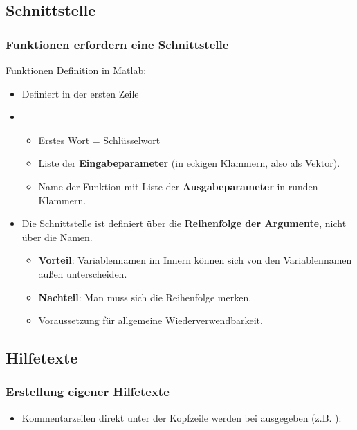   \subsection{Schnittstelle}
  \begin{frame}
      \frametitle{Funktionen erfordern eine Schnittstelle}
      Funktionen Definition in Matlab:
      \begin{itemize}
        \item Definiert in der ersten Zeile
        \item {}
        \begin{itemize}
          \item Erstes Wort = Schlüsselwort 
          \item Liste der \textbf{Eingabeparameter} (in eckigen Klammern, also als Vektor).
          \item Name der Funktion mit Liste der \textbf{Ausgabeparameter} in runden Klammern.
        \end{itemize}
        \item Die Schnittstelle ist definiert über die \textbf{Reihenfolge der Argumente}, nicht über die Namen.
        \begin{itemize}
          \item \textbf{Vorteil}: Variablennamen im Innern können sich von den Variablennamen außen unterscheiden.
          \item \textbf{Nachteil}: Man muss sich die Reihenfolge merken.
          \item Voraussetzung für allgemeine Wiederverwendbarkeit.
        \end{itemize}
      \end{itemize}
  \end{frame}

  \subsection{Hilfetexte}
  \begin{frame}
      \frametitle{Erstellung eigener Hilfetexte}
      \begin{itemize}
        \item Kommentarzeilen direkt unter der Kopfzeile werden bei  ausgegeben
        (z.B. ):
        
      \end{itemize}
  \end{frame}

